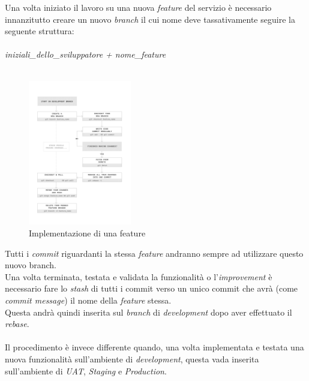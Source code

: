 \documentclass[11pt]{thesistemp}
\begin{document}
Una volta iniziato il lavoro su una nuova \textit{feature} del servizio è necessario innanzitutto creare un nuovo \textit{branch} il cui nome deve tassativamente seguire la seguente struttura:\\\\
\textit{iniziali\_dello\_sviluppatore + nome\_feature}\\\\
\begin{figure}
	\vspace{-50pt}
	\begin{center}
    	\includegraphics[width=0.4\textwidth]{git-flow.png}
  	\end{center}
  	\vspace{-10pt}
  	\caption{Implementazione di una feature}
  	\label{fig:git-flow}
  	\vspace{-9pt}
\end{figure}
Tutti i \textit{commit} riguardanti la stessa \textit{feature} andranno sempre ad utilizzare questo nuovo branch.\\
Una volta terminata, testata e validata la funzionalità o l'\textit{improvement} è necessario fare lo \textit{stash} di tutti i commit verso un unico commit che avrà (come \textit{commit message}) il nome della \textit{feature} stessa.\\
Questa andrà quindi inserita sul \textit{branch} di \textit{development} dopo aver effettuato il \textit{rebase}.\\\\
Il procedimento è invece differente quando, una volta implementata e testata una nuova funzionalità sull'ambiente di \textit{development}, questa vada inserita sull'ambiente di \textit{UAT}, \textit{Staging} e \textit{Production}.\\
\end{document}

